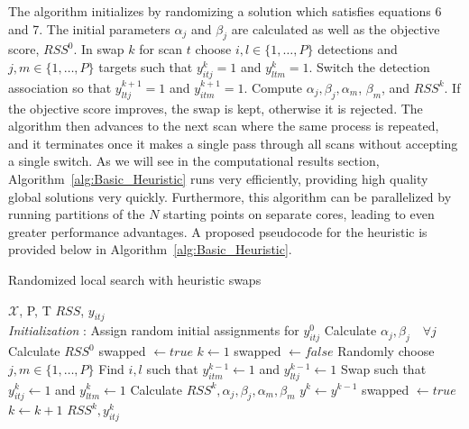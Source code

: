 \documentclass[journal]{IEEEtran}
\begin{document}
The algorithm initializes by randomizing a solution which satisfies equations 6 and 7. The initial  parameters $\alpha_{j}$ and $\beta_{j}$ are calculated as well as the objective score, $RSS^{0}$. In swap $k$ for scan $t$ choose $i,l\in \{1,\ldots,P\}$ detections and $j,m\in\{1,\ldots,P\}$ targets such that $y^k_{itj}=1$ and $y^k_{ltm}=1$. Switch the detection association so that $y^{k+1}_{ltj}=1$ and $y^{k+1}_{itm}=1$. Compute $\alpha_{j}, \beta_{j}, \alpha_{m}$, $\beta_{m}$, and $RSS^{k}$. If the objective score improves, the swap is kept, otherwise it is rejected. The algorithm then advances to the next scan where the same process is repeated, and it terminates once it makes a single pass through all scans without accepting a single switch. As we will see in the computational results section, Algorithm~\ref{alg:Basic_Heuristic} runs very efficiently, providing high quality global solutions very quickly. Furthermore, this algorithm can be parallelized by running partitions of the $N$ starting points on separate cores, leading to even greater performance advantages. A proposed pseudocode for the heuristic is provided below in Algorithm~\ref{alg:Basic_Heuristic}. 

\begin{algorithm}
 \caption{Randomized local search with heuristic swaps}
 \label{alg:Basic_Heuristic}
 \begin{algorithmic}[1]
  \renewcommand{\algorithmicrequire}{\textbf{Input:}}
  \renewcommand{\algorithmicensure}{\textbf{Output:}}
 \REQUIRE $\boldsymbol{\mathcal{X}}$, P, T
 \ENSURE  $RSS$, $y_{itj}$
 \\ \textit{Initialization} : Assign random initial assignments for $y^{0}_{itj}$
  \STATE Calculate $\alpha_{j}, \beta_{j} \quad \forall j $
  \STATE Calculate $RSS^{0}$
  \STATE swapped $\leftarrow true$
  \STATE $k\leftarrow1$
  \STATE swapped $\leftarrow false$
  \STATE Randomly choose $j,m\in\{1,\ldots,P\}$
  \STATE Find $i,l$ such that $y^{k-1}_{itm}\leftarrow1$ and $y^{k-1}_{ltj}\leftarrow1$
  \STATE Swap such that $y^{k}_{itj}\leftarrow1$ and $y^{k}_{ltm}\leftarrow1$
  \STATE Calculate $RSS^{k}, \alpha_{j}, \beta_{j}, \alpha_{m}, \beta_{m}$
  \STATE $y^{k} \leftarrow y^{k-1}$
  \ELSE 
  \STATE swapped $\leftarrow true$
  \ENDIF
  \ENDFOR
  \STATE $ k \leftarrow k + 1 $
  \ENDWHILE
 \RETURN $RSS^{k}, y^{k}_{itj}$ 
 \end{algorithmic} 
 \end{algorithm}
\end{document}
